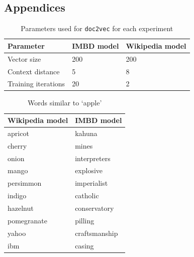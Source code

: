 \documentclass[11pt]{article}
\begin{document}
\newpage

\printbibliography

\subsection*{Appendices}

  \begin{table}[h]
    \begin{center}
      \begin{tabular}{l l l}
        Parameter & IMBD model & Wikipedia model\\
        \hline
        Vector size & 200 & 200\\
        Context distance & 5 & 8\\
        Training iterations & 20 & 2\\
      \end{tabular}
    \caption{Parameters used for \texttt{doc2vec} for each experiment}
    \label{tab:params}
    \end{center}
  \end{table}

  \begin{table}[h]
    \begin{center}
      \begin{tabular}{l l}
        Wikipedia model & IMBD model\\
        \hline
        apricot & kahuna\\
        cherry & mines\\
        onion & interpreters\\
        mango & explosive\\
        persimmon & imperialist\\
        indigo & catholic\\
        hazelnut & conservatory\\
        pomegranate & pilling\\
        yahoo & craftsmanship\\
        ibm & casing\\
      \end{tabular}
    \caption{Words similar to `apple'}
    \label{tab:apple}
    \end{center}
  \end{table}
\end{document}
